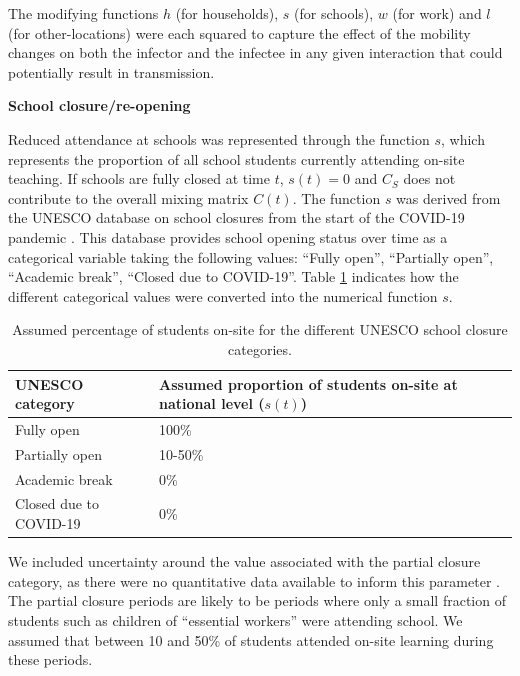 The modifying functions $h$ (for households), $s$ (for schools), $w$ (for work) and $l$ (for other-locations) were each squared to capture the effect of the mobility changes on 
both the infector and the infectee in any given interaction that could potentially result in transmission. 

\vspace{5pt}
\textbf{School closure/re-opening}

Reduced attendance at schools was represented through the function $s$, which represents the proportion of all school students 
currently attending on-site teaching. If schools are fully closed at time $t$, \(s(t)=0\) and \(C_{S}\) does not contribute to the overall 
mixing matrix \(C(t)\). 
The function $s$ was derived from the UNESCO database on school closures from the start of the COVID-19 pandemic \cite{unesco2023}.
This database provides school opening status over time as a categorical variable taking the following values: ``Fully open'', ``Partially open'', ``Academic break'', ``Closed due to COVID-19''.
Table \ref{tab:unesco_categories} indicates how the different categorical values were converted into the numerical function $s$.

\vspace{5pt}
\begin{table}[ht]  
  \begin{center}
    \caption{Assumed percentage of students on-site for the different UNESCO school closure categories.}
    \label{tab:unesco_categories}
    \begin{tabular}{p{5cm} | p{7cm}}
          \hline
          \textbf{UNESCO category} & \textbf{Assumed proportion of students on-site at national level ($s(t)$)} \\
          \hline
          Fully open & 100\% \\
          Partially open & 10-50\% \\
          Academic break & 0\% \\
          Closed due to COVID-19 & 0\% \\
          \hline
      \end{tabular}
    \end{center}
  \end{table}

We included uncertainty around the value associated with the partial closure category, as there were no quantitative data available to 
inform this parameter \cite{unesco2023}. The partial closure periods are likely to be periods where only a small fraction of students such as children of ``essential workers'' were 
attending school. We assumed that between 10 and 50\% of students attended on-site learning during these periods.

